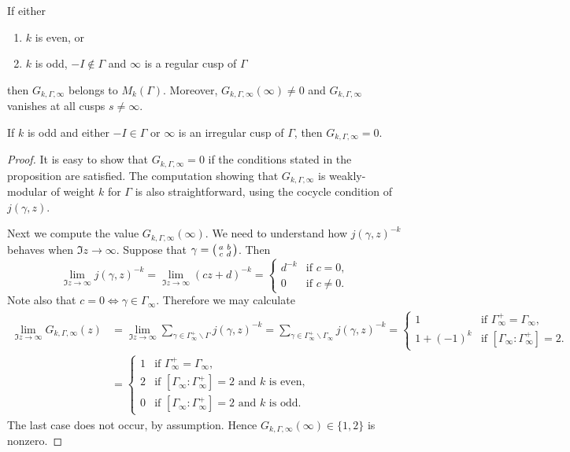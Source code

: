 \begin{proposition}
If either
\begin{enumerate}
\item $k$ is even, or
\item $k$ is odd, $-I\not\in\Gamma$ and $\infty$ is a regular cusp of $\Gamma$
\end{enumerate}
then $G_{k,\Gamma,\infty}$ belongs to $M_k(\Gamma)$. Moreover, $G_{k,\Gamma,\infty}(\infty)\neq 0$ and $G_{k,\Gamma,\infty}$ vanishes at all cusps $s\neq \infty$.

If $k$ is odd and either $-I\in\Gamma$ or $\infty$ is an irregular cusp of $\Gamma$, then $G_{k,\Gamma,\infty}=0$.
\end{proposition}
\begin{proof}
  It is easy to show that $G_{k,\Gamma,\infty}=0$ if the conditions stated in the proposition are satisfied. The computation showing that $G_{k,\Gamma,\infty}$ is weakly-modular of weight $k$ for $\Gamma$ is also straightforward, using the cocycle condition of $j(\gamma,z)$.

Next we compute the value $G_{k,\Gamma,\infty}(\infty)$. We need to understand how $j(\gamma,z)^{-k}$ behaves when $\Im z\to\infty$. Suppose that $\gamma=\left(\begin{smallmatrix}a&b\\c&d\end{smallmatrix}\right)$. Then
\[
\lim_{\Im z\to\infty} j(\gamma,z)^{-k}=\lim_{\Im z\to \infty} (cz+d)^{-k} = \begin{cases}
d^{-k}&\text{if }c=0,\\
0&\text{if }c\neq 0.
\end{cases}
\]
Note also that $c=0\iff \gamma\in\Gamma_\infty$. Therefore we may calculate
\begin{align*}
\lim_{\Im z\to \infty} G_{k,\Gamma,\infty}(z)&=\lim_{\Im z\to \infty} \sum_{\gamma\in\Gamma_\infty^+\backslash \Gamma} j(\gamma,z)^{-k}=\sum_{\gamma\in\Gamma_\infty^+\backslash\Gamma_\infty} j(\gamma,z)^{-k}=\begin{cases}
1&\text{if }\Gamma_\infty^+=\Gamma_\infty,\\
1+(-1)^k&\text{if }[\Gamma_\infty\colon\Gamma_\infty^+]=2.
\end{cases}\\
&=\begin{cases}
1&\text{if } \Gamma_\infty^+=\Gamma_\infty,\\
2&\text{if } [\Gamma_\infty\colon\Gamma_\infty^+]=2\text{ and } k\text{ is even,}\\
0&\text{if } [\Gamma_\infty\colon\Gamma_\infty^+]=2\text{ and } k\text{ is odd.}
\end{cases}
\end{align*}
The last case does not occur, by assumption. Hence $G_{k,\Gamma,\infty}(\infty)\in \{1,2\}$ is nonzero.


\end{proof}
